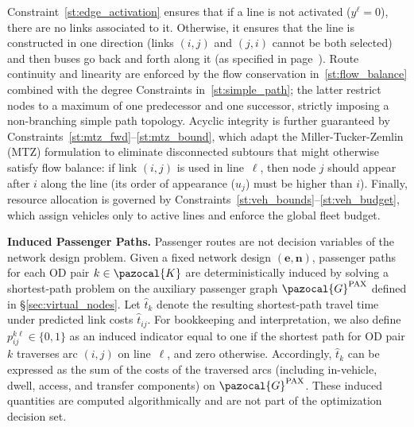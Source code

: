 \documentclass[a4paper,fleqn]{cas-sc}
\begin{document}
%
Constraint~\eqref{st:edge_activation} ensures that if a line is not activated ($y^\ell=0$), there are no links associated to it. Otherwise, it ensures that the line is constructed in one direction (links $(i,j)$ and $(j,i)$ cannot be both selected) and then buses go back and forth along it (as specified in page~\pageref{sentence:line-in-one-direction}).
%
%
%
Route continuity and linearity are enforced by the flow conservation in~\eqref{st:flow_balance} combined with the degree Constraints in~\eqref{st:simple_path}; the latter restrict nodes to a maximum of one predecessor and one successor, strictly imposing a non-branching simple path topology. 
%
Acyclic integrity is further guaranteed by Constraints~\eqref{st:mtz_fwd}--\eqref{st:mtz_bound}, which adapt the Miller-Tucker-Zemlin (MTZ) formulation to eliminate disconnected subtours that might otherwise satisfy flow balance: if link $(i,j)$ is used in line~$\ell$, then node $j$ should appear after $i$ along the line (its order of appearance ($u_j$) must be higher than $i$).
%
Finally, resource allocation is governed by Constraints~\eqref{st:veh_bounds}--\eqref{st:veh_budget}, which assign vehicles only to active lines and enforce the global fleet budget.
%

\textbf{Induced Passenger Paths.}
Passenger routes are not decision variables of the network design problem.
Given a fixed network design $(\mathbf e,\mathbf n)$, passenger paths for each OD pair $k\in\pazocal{K}$ are deterministically induced by solving a shortest-path problem on the auxiliary passenger graph $\pazocal{G}^{\text{PAX}}$ defined in \S\ref{sec:virtual_nodes}.
Let $\hat t_k$ denote the resulting shortest-path travel time under predicted link costs $\hat t_{ij}$.
For bookkeeping and interpretation, we also define $p_{ij}^{k\ell}\in\{0,1\}$ as an induced indicator equal to one if the shortest path for OD pair $k$ traverses arc $(i,j)$ on line~$\ell$, and zero otherwise.
Accordingly, $\hat t_k$ can be expressed as the sum of the costs of the traversed arcs (including in-vehicle, dwell, access, and transfer components) on $\pazocal{G}^{\text{PAX}}$.
These induced quantities are computed algorithmically and are not part of the optimization decision set.
\end{document}
